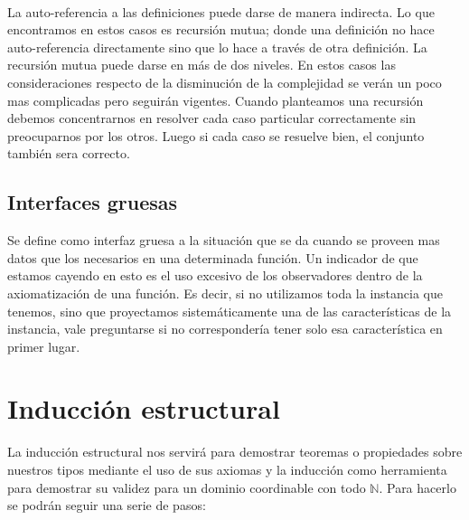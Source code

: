 ~

La auto-referencia a las definiciones puede darse de manera indirecta. Lo que encontramos en estos casos es recursi\'on mutua; donde una definici\'on no hace auto-referencia directamente sino que lo hace a trav\'es de otra definici\'on. La recursi\'on mutua puede darse en m\'as de dos niveles. En estos casos las consideraciones respecto de la disminuci\'on de la complejidad se ver\'an un poco mas complicadas pero seguir\'an vigentes. Cuando planteamos una recursi\'on debemos concentrarnos en resolver cada caso particular correctamente sin preocuparnos por los otros. Luego si cada caso se resuelve bien, el conjunto tambi\'en sera correcto.

\subsection{Interfaces gruesas}

Se define como interfaz gruesa a la situaci\'on que se da cuando se proveen mas datos que los necesarios en una determinada funci\'on. Un indicador de que estamos cayendo en esto es el uso excesivo de los observadores dentro de la axiomatizaci\'on de una funci\'on. Es decir, si no utilizamos toda la instancia que tenemos, sino que proyectamos sistem\'aticamente una de las caracter\'isticas de la instancia, vale preguntarse si no corresponder\'ia tener solo esa caracter\'istica en primer lugar.

\newpage
\section{Inducci\'on estructural}

La inducci\'on estructural nos servir\'a para demostrar teoremas o propiedades sobre nuestros tipos mediante el uso de sus axiomas y la inducci\'on como herramienta para demostrar su validez para un dominio coordinable con todo $\mathbb{N}$. Para hacerlo se podr\'an seguir una serie de pasos:

